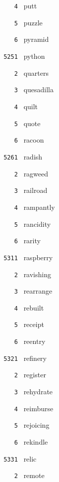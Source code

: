\documentclass[11pt]{article}
\begin{document}
\begin{multicols}{6}
\noindent \texttt{ \ \ \ 4 } putt  \par
\noindent \texttt{ \ \ \ 5 } puzzle  \par
\noindent \texttt{ \ \ \ 6 } pyramid  \par
\vspace{3mm}
\noindent \texttt{ 5251 } python  \par
\noindent \texttt{ \ \ \ 2 } quarters  \par
\noindent \texttt{ \ \ \ 3 } quesadilla  \par
\noindent \texttt{ \ \ \ 4 } quilt  \par
\noindent \texttt{ \ \ \ 5 } quote  \par
\noindent \texttt{ \ \ \ 6 } racoon  \par
\vspace{3mm}
\noindent \texttt{ 5261 } radish  \par
\noindent \texttt{ \ \ \ 2 } ragweed  \par
\noindent \texttt{ \ \ \ 3 } railroad  \par
\noindent \texttt{ \ \ \ 4 } rampantly  \par
\noindent \texttt{ \ \ \ 5 } rancidity  \par
\noindent \texttt{ \ \ \ 6 } rarity  \par
\noindent \texttt{ 5311 } raspberry  \par
\noindent \texttt{ \ \ \ 2 } ravishing  \par
\noindent \texttt{ \ \ \ 3 } rearrange  \par
\noindent \texttt{ \ \ \ 4 } rebuilt  \par
\noindent \texttt{ \ \ \ 5 } receipt  \par
\noindent \texttt{ \ \ \ 6 } reentry  \par
\vspace{3mm}
\noindent \texttt{ 5321 } refinery  \par
\noindent \texttt{ \ \ \ 2 } register  \par
\noindent \texttt{ \ \ \ 3 } rehydrate  \par
\noindent \texttt{ \ \ \ 4 } reimburse  \par
\noindent \texttt{ \ \ \ 5 } rejoicing  \par
\noindent \texttt{ \ \ \ 6 } rekindle  \par
\vspace{3mm}
\noindent \texttt{ 5331 } relic  \par
\noindent \texttt{ \ \ \ 2 } remote  \par

\end{multicols}
\end{document}
